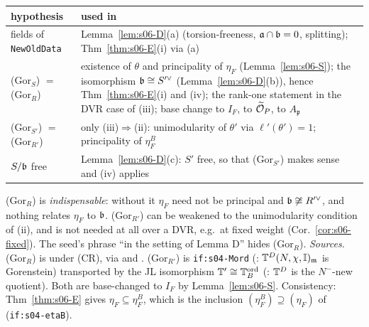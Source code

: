 \begin{remark}\label{rem:s06-gor-uses}
\leavevmode
\begin{center}\small
\begin{tabular}{@{}p{}p{}@{}}
\toprule
hypothesis & used in \\
\midrule
fields of \texttt{NewOldData} & Lemma~\ref{lem:s06-D}(a) (torsion-freeness, $\mathfrak{a}\cap\mathfrak{b}=0$, splitting); Thm~\ref{thm:s06-E}(i) via (a) \\
(Gor$_S$) $=$ (Gor$_R$) & existence of $\theta$ and principality of $\eta_F$ (Lemma~\ref{lem:s06-S}); the isomorphism $\mathfrak{b}\cong S'^\vee$
  (Lemma~\ref{lem:s06-D}(b)), hence Thm~\ref{thm:s06-E}(i) and (iv); the rank-one statement in the DVR case of (iii); base change to
  $I_F$, to $\widetilde{\mathcal{O}}_P$, to $A_{\mathfrak p}$ \\
(Gor$_{S'}$) $=$ (Gor$_{R'}$) & only (iii)$\Rightarrow$(ii): unimodularity of $\theta'$ via $\ell'(\theta')=1$; principality of $\eta^B_F$ \\
$S/\mathfrak{b}$ free & Lemma~\ref{lem:s06-D}(c): $S'$ free, so that (Gor$_{S'}$) makes sense and (iv) applies \\
\bottomrule
\end{tabular}
\end{center}
(Gor$_R$) is \emph{indispensable}: without it $\eta_F$ need not be principal and $\mathfrak{b}\not\cong R'^\vee$, and nothing relates $\eta_F$ to
$\mathfrak{b}$. (Gor$_{R'}$) can be weakened to the unimodularity condition of (ii), and is not needed at all over a DVR, e.g.\ at fixed
weight (Cor.~\ref{cor:s06-fixed}). The seed's phrase ``in the setting of Lemma D'' hides (Gor$_R$).
\emph{Sources.} (Gor$_R$) is \cite[\S3.3, p.~17--18]{Hs}  \stcited{} under (CR), via \cite[Cor.~2, p.~482]{Wi95}
 and \cite[\S9 Prop.~2]{MW86}.
(Gor$_{R'}$) is \texttt{if:s04-Mord} (\cite[Thm~4.5 and proof, p.~34]{Hs}: $\mathbb{T}^D(N,\chi,\mathbb I)_{\mathfrak{m}}$ is Gorenstein) transported by the
JL isomorphism $\mathbb{T}'\cong\mathbb{T}^{\mathrm{ord}}_B$ (\cite[Rem.~7.8, p.~71]{Hs}: $\mathbb{T}^D$ is the $N^-$-new quotient). Both are base-changed to $I_F$ by
Lemma~\ref{lem:s06-S}. Consistency: Thm~\ref{thm:s06-E} gives $\eta_F\subseteq\eta^B_F$, which is the inclusion
$(\eta^B_F)\supseteq(\eta_F)$ of \cite[Rem.~7.8]{Hs} (\texttt{if:s04-etaB}).
\end{remark}

